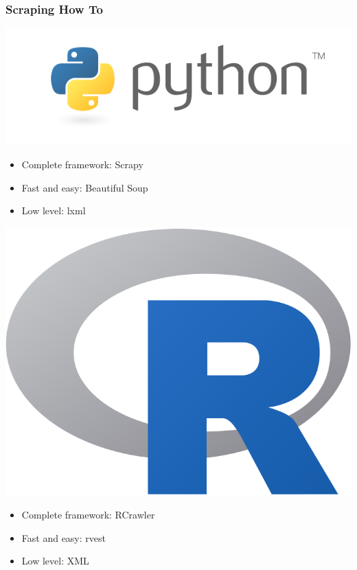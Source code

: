 \begin{frame}
    \frametitle{Scraping How To}
\hspace*{-0.5cm}
\vspace{-8pt}
\includegraphics[scale=0.15]{img/logos/python}
        \begin{itemize}
        \item Complete framework: Scrapy
        \item Fast and easy: Beautiful Soup
        \item Low level: lxml
    \end{itemize}

\vspace{15pt}
\hspace*{0.1cm}
\includegraphics[scale=0.03]{img/logos/r}
\vspace{-2pt}
    \begin{itemize}
        \item Complete framework: RCrawler
        \item Fast and easy: rvest
        \item Low level: XML
    \end{itemize}

\end{frame}

